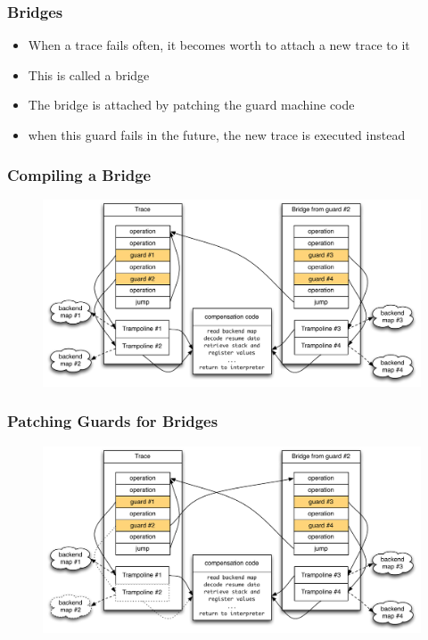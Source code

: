 \documentclass[utf8x]{beamer}
\begin{document}
\begin{frame}
  \frametitle{Bridges}
  \begin{itemize}
      \item When a trace fails often, it becomes worth to attach a new trace to it
          \item This is called a bridge
          \item The bridge is attached by patching the guard machine code
          \item when this guard fails in the future, the new trace is executed instead
  \end{itemize}
\end{frame}


\begin{frame}
  \frametitle{Compiling a Bridge}
  \begin{figure}
  \centering
  \includegraphics[width=1\textwidth]{figures/bridge_compiled.pdf}
  \end{figure}
\end{frame}
\begin{frame}
  \frametitle{Patching Guards for Bridges}
  \begin{figure}
  \centering
  \includegraphics[width=1\textwidth]{figures/bridge_patched.pdf}
  \end{figure}
\end{frame}
\end{document}
